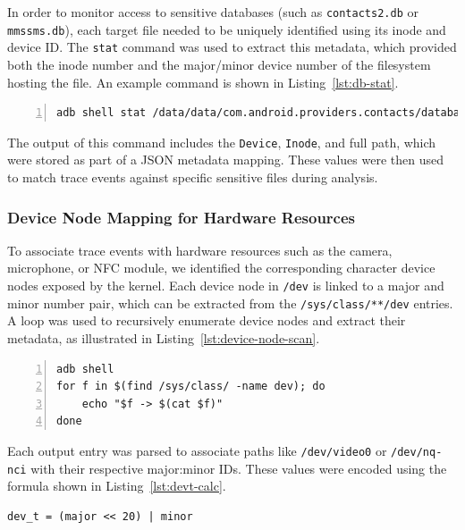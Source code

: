 \documentclass[a4paper,12pt]{report}
\begin{document}
In order to monitor access to sensitive databases (such as \texttt{contacts2.db} or \texttt{mmssms.db}), each target file needed to be uniquely identified using its inode and device ID. The \texttt{stat} command was used to extract this metadata, which provided both the inode number and the major/minor device number of the filesystem hosting the file. An example command is shown in Listing~\ref{lst:db-stat}.

\begin{lstlisting}[language=sh,caption={Retrieving inode and device ID for a database file},label={lst:db-stat},numbers=left]
adb shell stat /data/data/com.android.providers.contacts/databases/contacts2.db
\end{lstlisting}

The output of this command includes the \texttt{Device}, \texttt{Inode}, and full path, which were stored as part of a JSON metadata mapping. These values were then used to match trace events against specific sensitive files during analysis.

\subsubsection{Device Node Mapping for Hardware Resources}

To associate trace events with hardware resources such as the camera, microphone, or NFC module, we identified the corresponding character device nodes exposed by the kernel. Each device node in \texttt{/dev} is linked to a major and minor number pair, which can be extracted from the \texttt{/sys/class/**/dev} entries. A loop was used to recursively enumerate device nodes and extract their metadata, as illustrated in Listing~\ref{lst:device-node-scan}.

\begin{lstlisting}[caption={Enumerating character and block devices with major:minor IDs},label={lst:device-node-scan},numbers=left]
adb shell
for f in $(find /sys/class/ -name dev); do
    echo "$f -> $(cat $f)"
done
\end{lstlisting}

Each output entry was parsed to associate paths like \texttt{/dev/video0} or \texttt{/dev/nq-nci} with their respective major:minor IDs. These values were encoded using the formula shown in Listing~\ref{lst:devt-calc}.

\begin{lstlisting}[caption={Encoding device number using major and minor},label={lst:devt-calc},numbers=none]
dev_t = (major << 20) | minor
\end{lstlisting}
\end{document}
